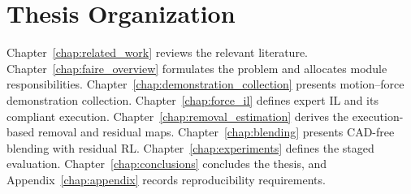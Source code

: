 \section{Thesis Organization}
Chapter~\ref{chap:related_work} reviews the relevant literature. Chapter~\ref{chap:faire_overview} formulates the problem and allocates module responsibilities. Chapter~\ref{chap:demonstration_collection} presents motion--force demonstration collection. Chapter~\ref{chap:force_il} defines expert IL and its compliant execution. Chapter~\ref{chap:removal_estimation} derives the execution-based removal and residual maps. Chapter~\ref{chap:blending} presents CAD-free blending with residual RL. Chapter~\ref{chap:experiments} defines the staged evaluation. Chapter~\ref{chap:conclusions} concludes the thesis, and Appendix~\ref{chap:appendix} records reproducibility requirements.
